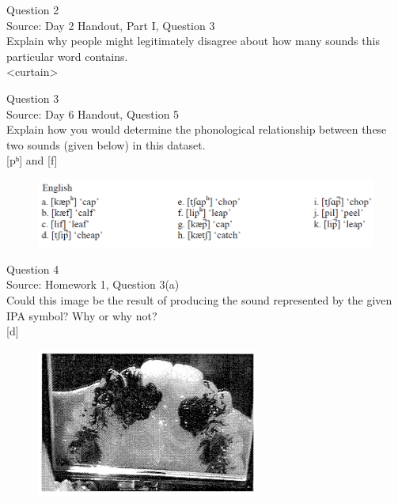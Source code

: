 \documentclass[12pt]{article}
\begin{document}
\newpage

{\large Question 2}\\

Source: Day 2 Handout, Part I, Question 3\\

Explain why people might legitimately disagree about how many sounds this particular word contains.\\

<curtain>


\newpage

{\large Question 3}\\

Source: Day 6 Handout, Question 5\\

Explain how you would determine the phonological relationship between these two sounds (given below) in this dataset.\\

{[pʰ]} and {[f]}

\begin{figure}[H]
\includegraphics{../images/english_labials.png}
\end{figure}

\newpage

{\large Question 4}\\

Source: Homework 1, Question 3(a)\\

Could this image be the result of producing the sound represented by the given IPA symbol? Why or why not?\\

{[d]}

\begin{figure}[H]
\includegraphics{../images/staticpalatography_fricative.png}
\end{figure}
\end{document}
